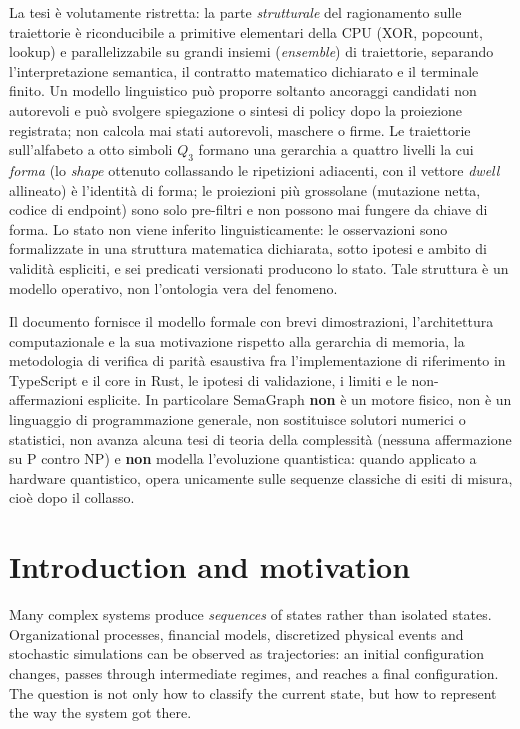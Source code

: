 \documentclass[11pt,a4paper]{article}
\begin{document}
La tesi è volutamente ristretta: la parte \emph{strutturale} del ragionamento
sulle traiettorie è riconducibile a primitive elementari della CPU (XOR, popcount,
lookup) e parallelizzabile su grandi insiemi (\emph{ensemble}) di traiettorie,
separando l'interpretazione semantica, il contratto matematico dichiarato e il
terminale finito. Un modello linguistico può proporre soltanto ancoraggi candidati
non autorevoli e può svolgere spiegazione o sintesi di policy dopo la proiezione
registrata; non calcola mai stati autorevoli, maschere o firme. Le traiettorie
sull'alfabeto a otto simboli $Q_3$ formano una gerarchia a
quattro livelli la cui \emph{forma} (lo \emph{shape} ottenuto collassando le
ripetizioni adiacenti, con il vettore \emph{dwell} allineato) è l'identità di
forma; le proiezioni più grossolane (mutazione netta, codice di endpoint) sono
solo pre-filtri e non possono mai fungere da chiave di forma. Lo stato non viene
inferito linguisticamente: le osservazioni sono formalizzate in una struttura
matematica dichiarata, sotto ipotesi e ambito di validità espliciti, e sei
predicati versionati producono lo stato. Tale struttura è un modello operativo,
non l'ontologia vera del fenomeno.

Il documento fornisce il modello formale con brevi dimostrazioni, l'architettura
computazionale e la sua motivazione rispetto alla gerarchia di memoria, la
metodologia di verifica di parità esaustiva fra l'implementazione di riferimento
in TypeScript e il core in Rust, le ipotesi di validazione, i limiti e le
non-affermazioni esplicite. In particolare SemaGraph \textbf{non} è un motore
fisico, non è un linguaggio di programmazione generale, non sostituisce solutori
numerici o statistici, non avanza alcuna tesi di teoria della complessità (nessuna
affermazione su P contro NP) e \textbf{non} modella l'evoluzione quantistica:
quando applicato a hardware quantistico, opera unicamente sulle sequenze classiche
di esiti di misura, cioè dopo il collasso.

\tableofcontents
\bigskip

\section{Introduction and motivation}
Many complex systems produce \emph{sequences} of states rather than isolated
states. Organizational processes, financial models, discretized physical events
and stochastic simulations can be observed as trajectories: an initial
configuration changes, passes through intermediate regimes, and reaches a final
configuration. The question is not only how to classify the current state, but how
to represent the way the system got there.
\end{document}
